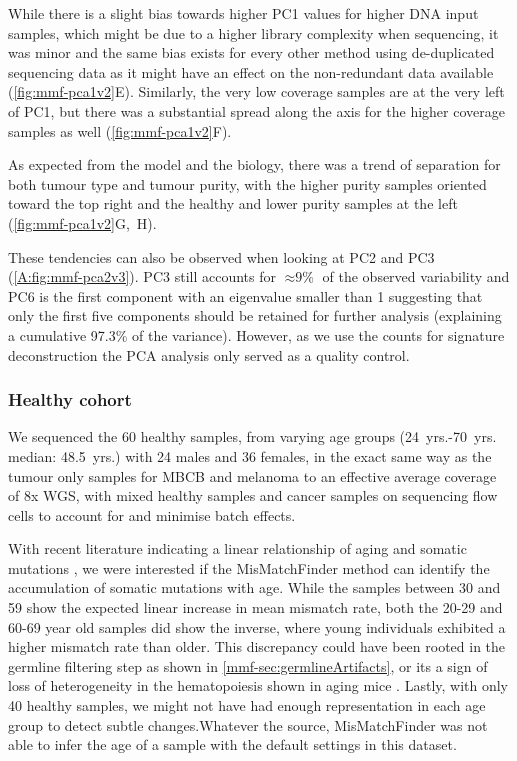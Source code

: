 While there is a slight bias towards higher PC1 values for higher DNA input samples, which might be due to a higher library complexity when sequencing, it was minor and the same bias exists for every other method using de-duplicated sequencing data as it might have an effect on the non-redundant data available (\autoref{fig:mmf-pca1v2}E). Similarly, the very low coverage samples are at the very left of PC1, but there was a substantial spread along the axis for the higher coverage samples as well (\autoref{fig:mmf-pca1v2}F). 

As expected from the model and the biology, there was a trend of separation for both tumour type and tumour purity, with the higher purity samples oriented toward the top right and the healthy and lower purity samples at the left (\autoref{fig:mmf-pca1v2}G,~H).

These tendencies can also be observed when looking at PC2 and PC3 (\autoref{A:fig:mmf-pca2v3}). PC3 still accounts for $\approx \text{9\%}$ of the observed variability and PC6 is the first component with an eigenvalue smaller than 1 suggesting that only the first five components should be retained for further analysis (explaining a cumulative 97.3\% of the variance). However, as we use the counts for signature deconstruction the PCA analysis only served as a quality control.


\subsubsection{Healthy cohort}
\label{mmf-sec:healthy}

We sequenced the 60 healthy samples, from varying age groups (\num{24}~yrs.-\num{70}~yrs. median: \num{48.5}~yrs.) with 24 males and 36 females, in the exact same way as the tumour only samples for MBCB and melanoma to an effective average coverage of 8x WGS, with mixed healthy samples and cancer samples on sequencing flow cells to account for and minimise batch effects.

With recent literature indicating a linear relationship of aging and somatic mutations \cite{Martincorena2018,Abascal2021,Cagan2022}, we were interested if the MisMatchFinder method can identify the accumulation of  somatic mutations with age. While the samples between 30 and 59 show the expected linear increase in mean mismatch rate, both the 20-29 and 60-69 year old samples did show the inverse, where young individuals exhibited a higher mismatch rate than older. This discrepancy could have been rooted in the germline filtering step as shown in \autoref{mmf-sec:germlineArtifacts}, or its a sign of loss of heterogeneity in the hematopoiesis shown in aging mice \cite{Ganuza2019}. Lastly, with only 40 healthy samples, we might not have had enough representation in each age group to detect subtle changes.Whatever the source, MisMatchFinder was not able to infer the age of a sample with the default settings in this dataset.


